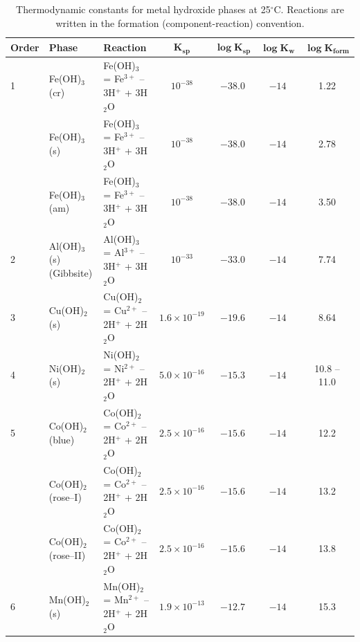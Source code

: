 \documentclass[final,2p,times]{elsarticle}
\begin{document}
\begin{table}[!ht]
\centering
\scriptsize
\caption{Thermodynamic constants for metal hydroxide phases at 25$^\circ$C.
Reactions are written in the formation (component-reaction) convention.}
\label{tab:ksp_hydroxides_updated}
\begin{tabular}{l l p{5.0cm} c c c c}
\hline
\textbf{Order} & \textbf{Phase} 
& \textbf{Reaction} 
& $\boldsymbol{K_{sp}}$ 
& $\boldsymbol{\log K_{sp}}$ 
& $\boldsymbol{\log K_w}$ 
& $\boldsymbol{\log K_{\text{form}}}$ \\
\hline
1 & Fe(OH)$_3$(cr) 
& Fe(OH)$_3$ = Fe$^{3+}$ -- 3H$^+$ + 3H$_2$O
& $10^{-38}$ & $-38.0$ & $-14$ & 1.22 \\

  & Fe(OH)$_3$(s) 
& Fe(OH)$_3$ = Fe$^{3+}$ -- 3H$^+$ + 3H$_2$O
& $10^{-38}$ & $-38.0$ & $-14$ & 2.78 \\

  & Fe(OH)$_3$(am) 
& Fe(OH)$_3$ = Fe$^{3+}$ -- 3H$^+$ + 3H$_2$O
& $10^{-38}$ & $-38.0$ & $-14$ & 3.50 \\

2 & Al(OH)$_3$(s) (Gibbsite)
& Al(OH)$_3$ = Al$^{3+}$ -- 3H$^+$ + 3H$_2$O
& $10^{-33}$ & $-33.0$ & $-14$ & 7.74 \\

3 & Cu(OH)$_2$(s) 
& Cu(OH)$_2$ = Cu$^{2+}$ -- 2H$^+$ + 2H$_2$O
& $1.6 \times 10^{-19}$ & $-19.6$ & $-14$ & 8.64 \\

4 & Ni(OH)$_2$(s) 
& Ni(OH)$_2$ = Ni$^{2+}$ -- 2H$^+$ + 2H$_2$O
& $5.0 \times 10^{-16}$ & $-15.3$ & $-14$ & 10.8 -- 11.0 \\

5 & Co(OH)$_2$(blue) 
& Co(OH)$_2$ = Co$^{2+}$ -- 2H$^+$ + 2H$_2$O
& $2.5 \times 10^{-16}$ & $-15.6$ & $-14$ & 12.2 \\

  & Co(OH)$_2$(rose--I) 
& Co(OH)$_2$ = Co$^{2+}$ -- 2H$^+$ + 2H$_2$O
& $2.5 \times 10^{-16}$ & $-15.6$ & $-14$ & 13.2 \\

  & Co(OH)$_2$(rose--II) 
& Co(OH)$_2$ = Co$^{2+}$ -- 2H$^+$ + 2H$_2$O
& $2.5 \times 10^{-16}$ & $-15.6$ & $-14$ & 13.8 \\

6 & Mn(OH)$_2$(s) 
& Mn(OH)$_2$ = Mn$^{2+}$ -- 2H$^+$ + 2H$_2$O
& $1.9 \times 10^{-13}$ & $-12.7$ & $-14$ & 15.3 \\
\hline
\end{tabular}
\end{table}



\small


%
\end{document}
